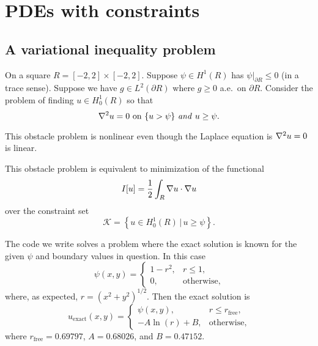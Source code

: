 
\chapter{PDEs with constraints}
\label{chap:constrained}

\section{A variational inequality problem}

On a square $R = [-2,2]\times [-2,2]$.  Suppose $\psi \in H^1(R)$ has $\psi\big|_{\partial R} \le 0$ (in a trace sense).  Suppose we have $g\in L^2(\partial R)$ where $g \ge 0$ a.e.~on $\partial R$.  Consider the problem of finding $u\in H_0^1(R)$ so that
\begin{equation}
    \nabla^2 u = 0 \text{ on } \{u > \psi\} \text{ \emph{and} } u\ge \psi. \label{obstaclestrong}
\end{equation}

This obstacle problem is nonlinear even though the Laplace equation is $\nabla^2 u = 0$ is linear.

This obstacle problem is equivalent to minimization of the functional
\begin{equation}
I[u] = \frac{1}{2} \int_R \nabla u\cdot \nabla u
\end{equation}
over the constraint set
\begin{equation}
\mathcal{K} = \left\{u \in H_0^1(R) \,\Big|\, u\ge \psi\right\}.
\end{equation}

The code we write solves a problem where the exact solution is known for the given $\psi$ and boundary values in question.  In this case
   $$\psi(x,y) = \begin{cases} 1 - r^2, & r \le 1, \\  0, & \text{otherwise},\end{cases}$$
where, as expected, $r = (x^2+y^2)^{1/2}$.%
Then the exact solution is
   $$u_{\text{exact}}(x,y) = \begin{cases} \psi(x,y), & r \le r_{\text{free}}, \\  - A \ln(r) + B, & \text{otherwise},\end{cases}$$
where $r_{\text{free}} = 0.69797$, $A = 0.68026$, and $B = 0.47152$.



